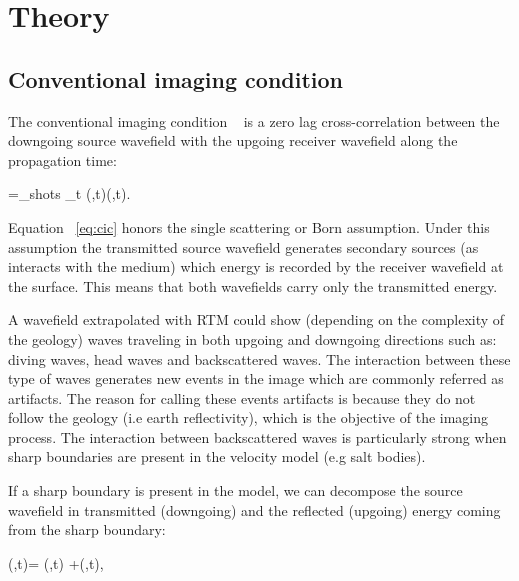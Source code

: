 \section{Theory}

\subsection{Conventional imaging condition}
The conventional imaging condition ~\citep{Claerbout:1985:IEI:3887}
is a zero lag cross-correlation between the downgoing source wavefield with the upgoing 
receiver wavefield along the propagation time:

\beq
\R=\sum_{shots} \sum_{t} \US(\xx,t)\UR(\xx,t).
\label{eq:cic}
\eeq

Equation ~\ref{eq:cic} honors the single scattering or Born assumption. Under this assumption the transmitted
source wavefield generates secondary sources (as interacts with the medium) which energy is recorded by the 
receiver wavefield at the surface. This means that both wavefields carry only the transmitted energy. 


A wavefield extrapolated with RTM could show (depending on the complexity of the geology) waves traveling in both
upgoing and downgoing directions such as: diving waves, head waves and backscattered waves. The interaction between
 these type of waves generates new events in the image which are commonly referred as artifacts. The reason for calling
 these events artifacts is because they do not follow the geology (i.e earth reflectivity), which is the objective 
of the imaging process. The interaction between backscattered waves is particularly strong when
sharp boundaries are present in the velocity model (e.g salt bodies).

If a sharp boundary is present in the model, we can decompose the source wavefield in transmitted (downgoing) 
 and the reflected (upgoing) energy coming from the sharp boundary:

\beq
\US(\xx,t)= \USr(\xx,t) +\USt(\xx,t),
\label{eq:ssplit}
\eeq

